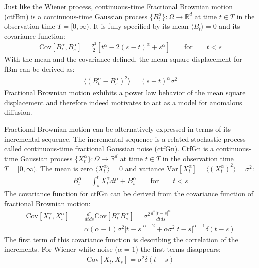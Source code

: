 \documentclass[
  a4paper,BCOR10mm,oneside,
  headsepline,footsepline,%
  fleqn,openbib
]{scrbook}
\begin{document}
Just like the Wiener process, continuous-time Fractional Brownian motion (ctfBm) is a continuous-time Gaussian process $\{B^{\alpha}_t\}: \Omega \rightarrow \mathbb{R}^d$ at time $t \in T$ in the observation time $T =[0, \infty)$. It is fully specified by its mean $\langle B_t \rangle=0$ and its covariance function:
\begin{align}
\mathrm{Cov}[B^{\alpha}_t,B^{\alpha}_s]=\frac{\sigma^2}{2}[t^{\alpha}-2(s-t)^{\alpha}+s^{\alpha}] \qquad \text{for} \qquad t<s \label{correlationfunctionfbm}
\end{align}
With the mean and the covariance defined, the mean square displacement for fBm can be derived as: 
\begin{align}
\label{MSDfbm}
 \langle (B^{\alpha}_{t}-B^{\alpha}_{s})^2 \rangle = (s-t)^\alpha \sigma^2
\end{align}
Fractional Brownian motion exhibits a power law behavior of the mean square displacement and therefore indeed motivates to act as a model for anomalous diffusion.\par Fractional Brownian motion can be alternatively expressed in terms of its incremental sequence. The incremental sequence is a related stochastic process called continuous-time fractional Gaussian noise (ctfGn). CtfGn is a continuous-time Gaussian process $\{X^{\alpha}_t\}: \Omega \rightarrow \mathbb{R}^d$ at time $t \in T$ in the observation time $T =[0, \infty)$. The mean is zero  $\langle X^{\alpha}_t \rangle=0$   and variance $\mathrm{Var}[X^{\alpha}_t]= \langle (X^{\alpha}_t)^2 \rangle=\sigma^2$:
\begin{align}
  B^{\alpha}_t=\int^t_s X^{\alpha}_{t'} d t' +  B^{\alpha}_s \qquad \text{for} \qquad t<s
\end{align}
The covariance function for ctfGn can be derived from the covariance function of fractional Brownian motion:
\begin{align}
\mathrm{Cov}[X^{\alpha}_t,X^{\alpha}_s]&= \frac{d^2}{dt ds} \mathrm{Cov}[B^{\alpha}_t B^{\alpha}_s]=\sigma^2 \frac{d^2 |t-s|^{\alpha}}{dtds} \label{eq:covfgn} \\
 &=\alpha (\alpha-1) \sigma^2 |t-s|^{\alpha-2}+\alpha \sigma^2 |t-s|^{\alpha-1} \delta(t-s) \label{eq:covfgn1}
\end{align}
The first term of this covariance function is describing the correlation of the increments. For Wiener white noise ($\alpha=1$) the first terms disappears:
\begin{align}
 \mathrm{Cov}[X_t,X_s]= \sigma^2 \delta(t-s)
\end{align}
\end{document}
